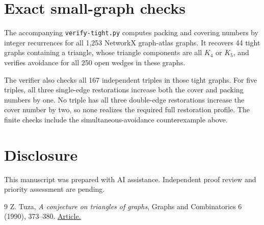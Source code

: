 \documentclass[11pt]{article}
\begin{document}
\section{Exact small-graph checks}
\enlargethispage{\baselineskip}

The accompanying \texttt{verify-tight.py} computes packing and covering numbers by integer recurrences for all 1,253 NetworkX graph-atlas graphs. It recovers 44 tight graphs containing a triangle, whose triangle components are all $K_4$ or $K_5$, and verifies avoidance for all 250 open wedges in these graphs.

The verifier also checks all 167 independent triples in those tight graphs. For five triples, all three single-edge restorations increase both the cover and packing numbers by one. No triple has all three double-edge restorations increase the cover number by two, so none realizes the required full restoration profile. The finite checks include the simultaneous-avoidance counterexample above.

\section*{Disclosure}
This manuscript was prepared with AI assistance. Independent proof review and priority assessment are pending.

\begin{thebibliography}{9}
 Z. Tuza, \emph{A conjecture on triangles of graphs}, Graphs and Combinatorics 6 (1990), 373--380. \href{https://doi.org/10.1007/BF01787705}{Article.}
\end{thebibliography}
\end{document}
